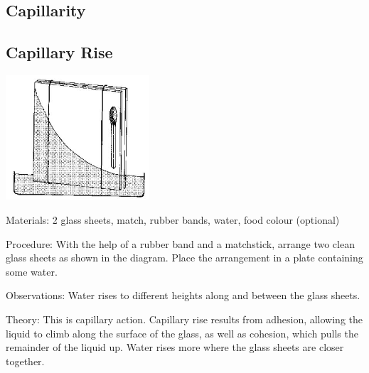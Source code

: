 \begin{multicols}{2}
\columnbreak


\section*{Capillarity}


\subsection{Capillary Rise}

\begin{center}
\includegraphics[width=0.4\textwidth]{./img/source/capillary-glass.jpg}
\end{center}

\begin{description*}
\item[Materials:]{2 glass sheets, match, rubber bands, water, food colour (optional)}
\item[Procedure:]{With the help of a rubber band and a matchstick, arrange two clean glass sheets as shown
in the diagram. Place the arrangement in a plate containing some water.}
\item[Observations:]{Water rises to different heights along and between the glass sheets. }
\item[Theory:]{This is capillary
action. Capillary rise results from adhesion, allowing the liquid to climb along the surface of the glass, as well as cohesion, which pulls the remainder of the liquid up. Water rises more where the glass sheets are closer together.}
\end{description*}


\end{multicols}
